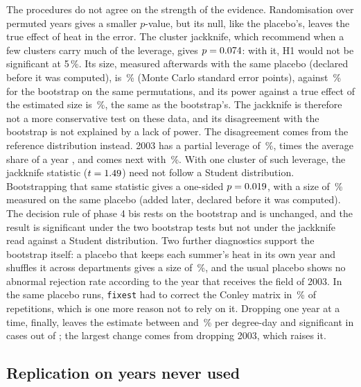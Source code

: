 The procedures do not agree on the strength of the evidence. Randomisation over permuted years gives a smaller $p$-value, but its null, like the placebo's, leaves the true effect of heat in the error. The cluster jackknife, which \textcite{mackinnon2023} recommend when a few clusters carry much of the leverage, gives $p = 0.074$: with it, H1 would not be significant at 5\,\%. Its size, measured afterwards with the same placebo (declared before it was computed), is \CvThreeSize\,\% (Monte Carlo standard error \CvThreeSizeMc{} points), against \QoneSizeWCR\,\% for the bootstrap on the same permutations, and its power against a true effect of the estimated size is \CvThreePowFull\,\%, the same as the bootstrap's. The jackknife is therefore not a more conservative test on these data, and its disagreement with the bootstrap is not explained by a lack of power. The disagreement comes from the reference distribution instead. 2003 has a partial leverage of \LevThree\,\%, \LevTwoThousandThreeRatio{} times the average share of a year \parencite{mackinnon2023summclust}, and \LevSecondYear{} comes next with \LevSecond\,\%. With one cluster of such leverage, the jackknife statistic ($t = 1.49$) need not follow a Student distribution. Bootstrapping that same statistic \parencite{mackinnon2023jae} gives a one-sided $p = 0.019$, with a size of \CvBootSize\,\% measured on the same placebo (added later, declared before it was computed). The decision rule of phase 4 bis rests on the bootstrap and is unchanged, and the result is significant under the two bootstrap tests but not under the jackknife read against a Student distribution. Two further diagnostics support the bootstrap itself: a placebo that keeps each summer's heat in its own year and shuffles it across departments gives a size of \WithinYearSize\,\%, and the usual placebo shows no abnormal rejection rate according to the year that receives the field of 2003. In the same placebo runs, \texttt{fixest} had to correct the Conley matrix in \ConleyFixedPct\,\% of repetitions, which is one more reason not to rely on it. Dropping one year at a time, finally, leaves the estimate between \LoyoYearMinPct{} and \LoyoYearMaxPct\,\% per degree-day and significant in \LoyoYearSig{} cases out of \LoyoYearN; the largest change comes from dropping 2003, which raises it.

\subsection{Replication on years never used}
\label{subsec:maize-repl}

